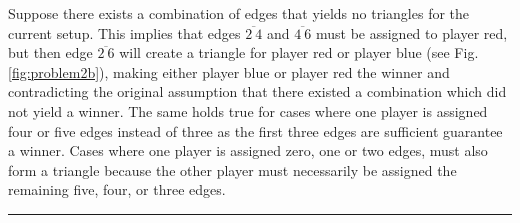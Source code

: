 \documentclass{article}
\begin{document}
Suppose there exists a combination of edges that yields no triangles for the current setup. This implies that edges $\overline{2 \ 4}$ and $\overline{4 \ 6}$ must be assigned to player red, but then edge $\overline{2 \ 6}$ will create a triangle for player red or player blue (see Fig. \ref{fig:problem2b}), making either player blue or player red the winner and contradicting the original assumption that there existed a combination which did not yield a winner. The same holds true for cases where one player is assigned four or five edges instead of three as the first three edges are sufficient guarantee a winner. Cases where one player is assigned zero, one or two edges, must also form a triangle because the other player must necessarily be assigned the remaining five, four, or three edges.

\noindent\rule{\textwidth}{0.4pt}\vspace{0.05in}
\end{document}
